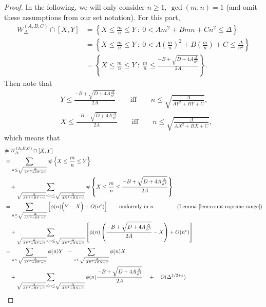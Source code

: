 \documentclass[11pt,letterpaper,reqno]{amsart}
\numberwithin{equation}{section}
\numberwithin{figure}{section}
\numberwithin{table}{section}
\newcommand{\lrp}[1]{\left(#1\right)}
\newcommand{\lrb}[1]{\left[#1\right]}
\newcommand{\lrcb}[1]{\left\{#1\right\}}
\begin{document}
\begin{proof}
In the following, we will only consider $n \ge 1,~ \gcd(m,n)=1$ (and omit these assumptions from our set notation).
For this part,  
\begin{align}
    W_{\Delta}^{(A,B,C)} \cap [X,Y] 
    &= \lrcb{X \le \frac{m}{n} \le Y ~:~  0 < A m^2 + B mn + C n^2  \le \Delta
    } \\
    &= \lrcb{X \le \frac{m}{n} \le Y ~:~  0 < A \lrp{\frac{m}{n}}^2 + B \lrp{\frac{m}{n}} + C  \le \frac{\Delta}{n^2}
    } \\
    &= \lrcb{X \le \frac{m}{n} \le Y ~:~  \frac{m}{n} \le \frac{-B+\sqrt{D+4A\frac{\Delta}{n^2}}}{2A}
    }. 
\end{align}
Then note that
\begin{align}
    &Y \le  \frac{-B+\sqrt{D+4A\frac{\Delta}{n^2}}}{2A}
     \qquad \text{iff}\qquad  n \le \sqrt{\frac{\Delta}{AY^2+BY+C}},
     \\
    &X \le  \frac{-B+\sqrt{D+4A\frac{\Delta}{n^2}}}{2A}
     \qquad \text{iff}\qquad  n \le \sqrt{\frac{\Delta}{AX^2+BX+C}},
\end{align}
which means that
\begin{align}
    & \#\, W_{\Delta}^{(A,B,C)} \cap [X,Y] \\
    &=
    \sum_{ n \le \sqrt{\frac{\Delta}{AY^2+BY+C}} }
    \# \lrcb{X \le \frac{m}{n} \le Y
    }
    \\
    &\quad+
    \sum_{
    \sqrt{\frac{\Delta}{AY^2+BY+C}} < n \le \sqrt{\frac{\Delta}{AX^2+BX+C}}}
    \#\lrcb{X \le \frac{m}{n} \le \frac{-B+\sqrt{D+4A\frac{\Delta}{n^2}}}{2A}   
    } \\
    &=
    \sum_{ n \le \sqrt{\frac{\Delta}{AY^2+BY+C}} } 
    \lrb{
        \phi(n) \Big(Y-X\Big) + O(n^{\varepsilon})
    } \qquad \text{uniformly in $n$ \qquad\qquad (Lemma \ref{lem:count-coprime-range})} \\
    &\quad+
    \sum_{ \sqrt{\frac{\Delta}{AY^2+BY+C}} < n \le \sqrt{\frac{\Delta}{AX^2+BX+C}} }
    \lrb{\phi(n) \lrp{ 
        \frac{-B+\sqrt{D+4A\frac{\Delta}{n^2}}}{2A}
        - X
    }
    + O(n^{\varepsilon})
    }  \\
    &=
    \sum_{ n \le \sqrt{\frac{\Delta}{AY^2+BY+C}}} 
    \phi(n)Y \ \ - \sum_{ n \le \sqrt{\frac{\Delta}{AX^2+BX+C}}} 
    \phi(n)X \quad  \\
    &\quad+
    \sum_{ \sqrt{\frac{\Delta}{AY^2+BY+C}} < n \le \sqrt{\frac{\Delta}{AX^2+BX+C}} }
    \phi(n)  
    \frac{-B+\sqrt{D+4A\frac{\Delta}{n^2}}}{2A}
    \quad+ \quad O(\Delta^{1/2+\varepsilon})
    \label{eqn:temp-equid-sum-sqrt-A>0,D>0}
    \\

\end{align}
\end{proof}
\end{document}
